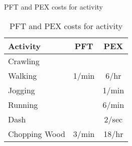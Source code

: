 \begin{table}{PFT and PEX costs for activity}
	\begin{tabular}{lcc}

	Activity		&	PFT & PEX \\	
\hline
	Crawling		&	   &	  \\
	Walking			& 1/min	& 6/hr \\
	Jogging			&		& 1/min \\
	Running			&	   & 6/min \\
	Dash			&		& 2/sec \\
	Chopping Wood	 & 3/min & 18/hr \\
    \end{tabular}
    \caption{PFT and PEX costs for activity}
\end{table}
